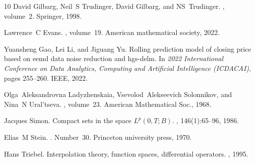 \documentclass[pdflatex,sn-mathphys-num]{sn-jnl}%
\theoremstyle{thmstyleone}
\theoremstyle{thmstyletwo}
\theoremstyle{thmstylethree}
\begin{document}
\begin{thebibliography}{10}
David Gilbarg, Neil~S Trudinger, David Gilbarg, and NS~Trudinger.
, volume~2.
\newblock Springer, 1998.

Lawrence~C Evans.
, volume~19.
\newblock American mathematical society, 2022.

Yuansheng Gao, Lei Li, and Jiguang Yu.
\newblock Rolling prediction model of closing price based on eemd data noise reduction and hgs-delm.
\newblock In {\em 2022 International Conference on Data Analytics, Computing and Artificial Intelligence (ICDACAI)}, pages 255--260. IEEE, 2022.

Olga~Aleksandrovna Ladyzhenskaia, Vsevolod~Alekseevich Solonnikov, and Nina~N Ural'tseva.
, volume~23.
\newblock American Mathematical Soc., 1968.

Jacques Simon.
\newblock Compact sets in the space ${L}^p(0,{T};{B})$.
, 146(1):65--96, 1986.

Elias~M Stein.
.
\newblock Number~30. Princeton university press, 1970.

Hans Triebel.
\newblock Interpolation theory, function spaces, differential operators.
, 1995.

\end{thebibliography}
\end{document}
